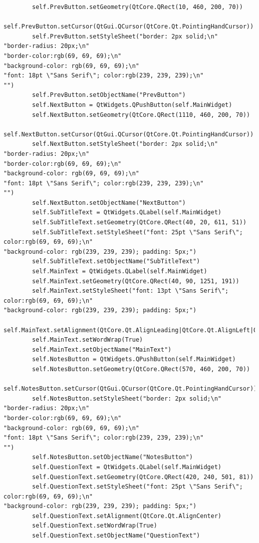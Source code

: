 \documentclass[12pt]{article}
\begin{document}
\begin{lstlisting}
        self.PrevButton.setGeometry(QtCore.QRect(10, 460, 200, 70))
        self.PrevButton.setCursor(QtGui.QCursor(QtCore.Qt.PointingHandCursor))
        self.PrevButton.setStyleSheet("border: 2px solid;\n"
"border-radius: 20px;\n"
"border-color:rgb(69, 69, 69);\n"
"background-color: rgb(69, 69, 69);\n"
"font: 18pt \"Sans Serif\"; color:rgb(239, 239, 239);\n"
"")
        self.PrevButton.setObjectName("PrevButton")
        self.NextButton = QtWidgets.QPushButton(self.MainWidget)
        self.NextButton.setGeometry(QtCore.QRect(1110, 460, 200, 70))
        self.NextButton.setCursor(QtGui.QCursor(QtCore.Qt.PointingHandCursor))
        self.NextButton.setStyleSheet("border: 2px solid;\n"
"border-radius: 20px;\n"
"border-color:rgb(69, 69, 69);\n"
"background-color: rgb(69, 69, 69);\n"
"font: 18pt \"Sans Serif\"; color:rgb(239, 239, 239);\n"
"")
        self.NextButton.setObjectName("NextButton")
        self.SubTitleText = QtWidgets.QLabel(self.MainWidget)
        self.SubTitleText.setGeometry(QtCore.QRect(40, 20, 611, 51))
        self.SubTitleText.setStyleSheet("font: 25pt \"Sans Serif\"; color:rgb(69, 69, 69);\n"
"background-color: rgb(239, 239, 239); padding: 5px;")
        self.SubTitleText.setObjectName("SubTitleText")
        self.MainText = QtWidgets.QLabel(self.MainWidget)
        self.MainText.setGeometry(QtCore.QRect(40, 90, 1251, 191))
        self.MainText.setStyleSheet("font: 13pt \"Sans Serif\"; color:rgb(69, 69, 69);\n"
"background-color: rgb(239, 239, 239); padding: 5px;")
        self.MainText.setAlignment(QtCore.Qt.AlignLeading|QtCore.Qt.AlignLeft|QtCore.Qt.AlignTop)
        self.MainText.setWordWrap(True)
        self.MainText.setObjectName("MainText")
        self.NotesButton = QtWidgets.QPushButton(self.MainWidget)
        self.NotesButton.setGeometry(QtCore.QRect(570, 460, 200, 70))
        self.NotesButton.setCursor(QtGui.QCursor(QtCore.Qt.PointingHandCursor))
        self.NotesButton.setStyleSheet("border: 2px solid;\n"
"border-radius: 20px;\n"
"border-color:rgb(69, 69, 69);\n"
"background-color: rgb(69, 69, 69);\n"
"font: 18pt \"Sans Serif\"; color:rgb(239, 239, 239);\n"
"")
        self.NotesButton.setObjectName("NotesButton")
        self.QuestionText = QtWidgets.QLabel(self.MainWidget)
        self.QuestionText.setGeometry(QtCore.QRect(420, 240, 501, 81))
        self.QuestionText.setStyleSheet("font: 25pt \"Sans Serif\"; color:rgb(69, 69, 69);\n"
"background-color: rgb(239, 239, 239); padding: 5px;")
        self.QuestionText.setAlignment(QtCore.Qt.AlignCenter)
        self.QuestionText.setWordWrap(True)
        self.QuestionText.setObjectName("QuestionText")

\end{lstlisting}
\end{document}
